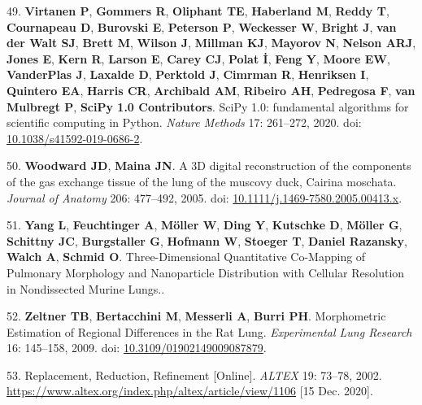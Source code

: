 \documentclass[
  american,
]{article}
\newenvironment{cslreferences}%
  {}%
  {\par}
\begin{document}
\begin{cslreferences}
\leavevmode\hypertarget{ref-8Miti2Gz}{}%
49. \textbf{Virtanen P}, \textbf{Gommers R}, \textbf{Oliphant TE}, \textbf{Haberland M}, \textbf{Reddy T}, \textbf{Cournapeau D}, \textbf{Burovski E}, \textbf{Peterson P}, \textbf{Weckesser W}, \textbf{Bright J}, \textbf{van der Walt SJ}, \textbf{Brett M}, \textbf{Wilson J}, \textbf{Millman KJ}, \textbf{Mayorov N}, \textbf{Nelson ARJ}, \textbf{Jones E}, \textbf{Kern R}, \textbf{Larson E}, \textbf{Carey CJ}, \textbf{Polat İ}, \textbf{Feng Y}, \textbf{Moore EW}, \textbf{VanderPlas J}, \textbf{Laxalde D}, \textbf{Perktold J}, \textbf{Cimrman R}, \textbf{Henriksen I}, \textbf{Quintero EA}, \textbf{Harris CR}, \textbf{Archibald AM}, \textbf{Ribeiro AH}, \textbf{Pedregosa F}, \textbf{van Mulbregt P}, \textbf{SciPy 1.0 Contributors}. SciPy 1.0: fundamental algorithms for scientific computing in Python. \emph{Nature Methods} 17: 261--272, 2020. doi: \href{https://doi.org/10.1038/s41592-019-0686-2}{10.1038/s41592-019-0686-2}.

\leavevmode\hypertarget{ref-CPhMy3Ie}{}%
50. \textbf{Woodward JD}, \textbf{Maina JN}. A 3D digital reconstruction of the components of the gas exchange tissue of the lung of the muscovy duck, Cairina moschata. \emph{Journal of Anatomy} 206: 477--492, 2005. doi: \href{https://doi.org/10.1111/j.1469-7580.2005.00413.x}{10.1111/j.1469-7580.2005.00413.x}.

\leavevmode\hypertarget{ref-19jBv0ima}{}%
51. \textbf{Yang L}, \textbf{Feuchtinger A}, \textbf{Möller W}, \textbf{Ding Y}, \textbf{Kutschke D}, \textbf{Möller G}, \textbf{Schittny JC}, \textbf{Burgstaller G}, \textbf{Hofmann W}, \textbf{Stoeger T}, \textbf{Daniel Razansky}, \textbf{Walch A}, \textbf{Schmid O}. Three-Dimensional Quantitative Co-Mapping of Pulmonary Morphology and Nanoparticle Distribution with Cellular Resolution in Nondissected Murine Lungs..

\leavevmode\hypertarget{ref-I9TmP6IU}{}%
52. \textbf{Zeltner TB}, \textbf{Bertacchini M}, \textbf{Messerli A}, \textbf{Burri PH}. Morphometric Estimation of Regional Differences in the Rat Lung. \emph{Experimental Lung Research} 16: 145--158, 2009. doi: \href{https://doi.org/10.3109/01902149009087879}{10.3109/01902149009087879}.

\leavevmode\hypertarget{ref-199ALtdJt}{}%
53. Replacement, Reduction, Refinement {[}Online{]}. \emph{ALTEX} 19: 73--78, 2002. \url{https://www.altex.org/index.php/altex/article/view/1106} {[}15 Dec. 2020{]}.
\end{cslreferences}
\end{document}
